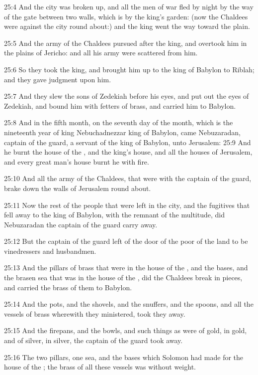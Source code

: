 25:4 And the city was broken up, and all the men of war fled by night
by the way of the gate between two walls, which is by the king's
garden: (now the Chaldees were against the city round about:) and the
king went the way toward the plain.

25:5 And the army of the Chaldees pursued after the king, and overtook
him in the plains of Jericho: and all his army were scattered from
him.

25:6 So they took the king, and brought him up to the king of Babylon
to Riblah; and they gave judgment upon him.

25:7 And they slew the sons of Zedekiah before his eyes, and put out
the eyes of Zedekiah, and bound him with fetters of brass, and carried
him to Babylon.

25:8 And in the fifth month, on the seventh day of the month, which is
the nineteenth year of king Nebuchadnezzar king of Babylon, came
Nebuzaradan, captain of the guard, a servant of the king of Babylon,
unto Jerusalem: 25:9 And he burnt the house of the \LORD, and the
king's house, and all the houses of Jerusalem, and every great man's
house burnt he with fire.

25:10 And all the army of the Chaldees, that were with the captain of
the guard, brake down the walls of Jerusalem round about.

25:11 Now the rest of the people that were left in the city, and the
fugitives that fell away to the king of Babylon, with the remnant of
the multitude, did Nebuzaradan the captain of the guard carry away.

25:12 But the captain of the guard left of the door of the poor of the
land to be vinedressers and husbandmen.

25:13 And the pillars of brass that were in the house of the \LORD, and
the bases, and the brasen sea that was in the house of the \LORD, did
the Chaldees break in pieces, and carried the brass of them to
Babylon.

25:14 And the pots, and the shovels, and the snuffers, and the spoons,
and all the vessels of brass wherewith they ministered, took they
away.

25:15 And the firepans, and the bowls, and such things as were of
gold, in gold, and of silver, in silver, the captain of the guard took
away.

25:16 The two pillars, one sea, and the bases which Solomon had made
for the house of the \LORD; the brass of all these vessels was without
weight.

